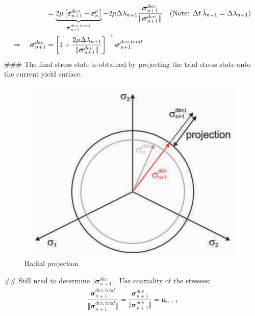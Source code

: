 \documentclass[]{scrartcl}
\begin{document}
\begin{easylist}
\begin{align*}
 &= \underbrace{2 \mu \left[ \boldsymbol{\varepsilon}^{dev}_{n+1} - \boldsymbol{\varepsilon}^{p}_{n} \right]}_{\boldsymbol{\sigma}^{dev, trial}_{n+1}}
  - 2 \mu \Delta \lambda_{n+1} \dfrac{\boldsymbol{\sigma}^{dev}_{n+1}}{\Vert \boldsymbol{\sigma}^{dev}_{n+1} \Vert} 
\quad (\textnormal{Note: } \Delta t \, \dot{\lambda}_{n+1} = \Delta \lambda_{n+1})
\\
\Rightarrow \quad
\boldsymbol{\sigma}^{dev}_{n+1}
 &= \left[ 1 + \dfrac{2 \mu \Delta \lambda_{n+1}}{\Vert \boldsymbol{\sigma}^{dev}_{n+1} \Vert} \right]^{-1} \boldsymbol{\sigma}^{dev, trial}_{n+1} 
\end{align*}
\clearpage
### The final stress state is obtained by projecting the trial stress state onto the current yield surface.
\begin{figure}[!htb]
\centering
\includegraphics[width=0.7\linewidth]{Figures/Sec_3_5_1-Radial_projection}
\caption{Radial projection \citep{Mergheim2018a}}
\label{fig:sec351-radialprojection}
\end{figure}
## Still need to determine $\Vert \boldsymbol{\sigma}^{dev}_{n+1} \Vert$. Use coaxiality of the stresses:
\begin{gather*}
\dfrac{\boldsymbol{\sigma}^{dev, trial}_{n+1}}{\Vert \boldsymbol{\sigma}^{dev, trial}_{n+1} \Vert}
  = \dfrac{\boldsymbol{\sigma}^{dev}_{n+1}}{\Vert \boldsymbol{\sigma}^{dev}_{n+1} \Vert}
  = \boldsymbol{n}_{n+1}

\end{gather*}
\end{easylist}
\end{document}
